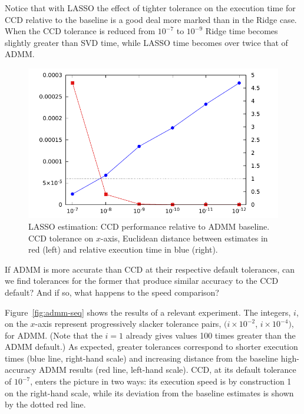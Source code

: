 \documentclass{article}
\begin{document}
Notice that with LASSO the effect of tighter tolerance on the
execution time for CCD relative to the baseline is a good deal more
marked than in the Ridge case. When the CCD tolerance is reduced from
$10^{-7}$ to $10^{-9}$ Ridge time becomes slightly greater than SVD
time, while LASSO time becomes over twice that of ADMM.

\begin{figure}[htbp]
\begin{center}
\includegraphics[scale=0.9]{ccd_admm.pdf}
\caption{LASSO estimation: CCD performance relative to ADMM
  baseline. CCD tolerance on $x$-axis, Euclidean distance between
  estimates in red (left) and relative execution time in blue
  (right).}
\label{fig:ccd-admm}
\end{center}
\end{figure}

If ADMM is more accurate than CCD at their respective default
tolerances, can we find tolerances for the former that produce similar
accuracy to the CCD default? And if so, what happens to the speed
comparison?

Figure~\ref{fig:admm-seq} shows the results of a relevant
experiment. The integers, $i$, on the $x$-axis represent progressively
slacker tolerance pairs, $(i\times 10^{-2}$, $i\times 10^{-4})$, for
ADMM.  (Note that the $i=1$ already gives values 100 times greater
than the ADMM default.) As expected, greater tolerances correspond to
shorter execution times (blue line, right-hand scale) and increasing
distance from the baseline high-accuracy ADMM results (red line,
left-hand scale).  CCD, at its default tolerance of $10^{-7}$, enters
the picture in two ways: its execution speed is by construction 1 on
the right-hand scale, while its deviation from the baseline estimates
is shown by the dotted red line.
\end{document}
